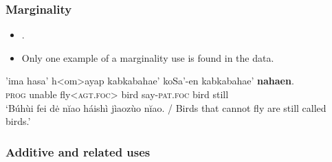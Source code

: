\subsubsection{Marginality}\label{appendixSaisiyatMarginality}
\begin{itemize}
	\item \textcite[110]{Huang2008}.
	\item Only one example of a marginality use is found in the data.
\end{itemize}
\begin{exe}
	\ex 
	\gll \rq{}ima hasa\rq{}  h<om>ayap kabkabahae\rq{} koSa\rq{}-en kabkabahae\rq{} \textbf{nahaen}.\\
\textsc{prog} unable fly<\textsc{agt}.\textsc{foc}> bird say-\textsc{pat}.\textsc{foc} bird still\\
\glt \lq Búhùi fei dė nĭao háishì jìaozùo nĭao. / Birds that cannot fly are still called birds.\rq{ }\parencite[110]{Huang2008}
\end{exe}


\subsubsection{Additive and related uses}
